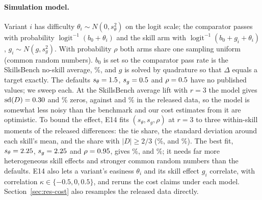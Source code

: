 \paragraph{Simulation model.} Variant $i$ has difficulty $\theta_i\sim N(0,s_\theta^2)$ on the logit scale; the comparator passes with probability $\operatorname{logit}^{-1}(b_0+\theta_i)$ and the skill arm with $\operatorname{logit}^{-1}(b_0+g_i+\theta_i)$, $g_i\sim N(g,s_g^2)$. With probability $\rho$ both arms share one sampling uniform (common random numbers). $b_0$ is set so the comparator pass rate is the SkillsBench no-skill average, \PBase\%, and $g$ is solved by quadrature so that $\Delta$ equals a target exactly. The defaults $s_\theta=1.5$, $s_g=0.5$ and $\rho=0.5$ have no published values; we sweep each. At the SkillsBench average lift with $r=3$ the model gives $\operatorname{sd}(D)=0.30$ and \NSbModelTies\% zeros, against \NSbSD{} and \NSbTies\% in the released data, so the model is somewhat less noisy than the benchmark and our cost estimates from it are optimistic. To bound the effect, E14 fits $(s_\theta,s_g,\rho)$ at $r=3$ to three within-skill moments of the released differences: the tie share, the standard deviation around each skill's mean, and the share with $|D|\ge2/3$ (\NRvObsTie\%, \NRvObsSD{} and \NRvObsBig\%). The best fit, $s_\theta=2.25$, $s_g=2.25$ and $\rho=0.95$, gives \NRvFitTie\%, \NRvFitSD{} and \NRvFitBig\%; it needs far more heterogeneous skill effects and stronger common random numbers than the defaults. E14 also lets a variant's easiness $\theta_i$ and its skill effect $g_i$ correlate, with correlation $\kappa\in\{-0.5,0,0.5\}$, and reruns the cost claims under each model. Section~\ref{sec:res-cost} also resamples the released data directly.

